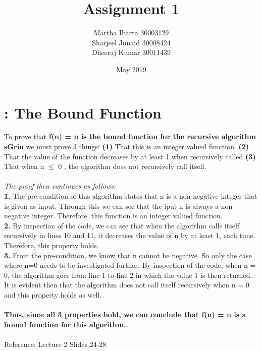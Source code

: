\documentclass{article}
\title{Assignment 1}
\author{Martha Ibarra 30003129
\\
Sharjeel Junaid 30008424
\\
Dheeraj Kumar 30011439
}
\date{May 2019}
\begin{document}
    \maketitle

    \section{: The Bound Function}
    To prove that
    \textbf{f(n) = n is the bound function for the recursive algorithm sGrin}
    we must prove 3 things: \textbf{(1)} That this is an integer valued function. \textbf{(2)} That the value of the function decreases by at least 1 when recursively called \textbf{(3)} That when n $\leq$ 0 , the algorithm does not recursively call itself.
    \\
    \\ \textit{ The proof then continues as follows: }
    \\
    \textbf{1.} The pre-condition of this algorithm states that n is a non-negative integer that is given as input. Through this we can see that the iput n is always a non-negative integer. Therefore, this function is an integer valued function.
    \\
    \textbf{2.} By inspection of the code, we can see that when the algorithm calls itself recursively in lines 10 and 11, it decreases the value of n by at least 1, each time. Therefore, this property holds.
    \\
    \textbf{3.} From the pre-condition, we know that n cannot be negative. So only the case where n=0 needs to be investigated further. By inspection of the code, when n = 0, the algorithm goes from line 1 to line 2 in which the value 1 is then returned. It is evident then that the algorithm does not call itself recursively when n = 0 and this property holds as well.
    \\
    \\\textbf{Thus, since all 3 properties hold, we can conclude that f(n) = n is a bound function for this algorithm.}
    \\
    \\Reference: Lecture 2 Slides 24-28
\end{document}
